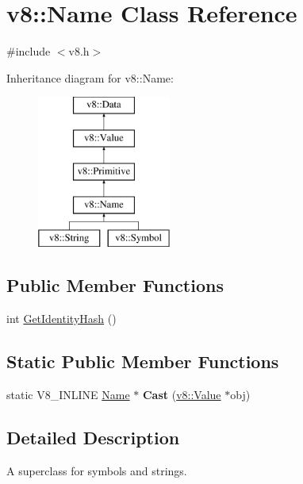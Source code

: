 \hypertarget{classv8_1_1Name}{}\section{v8\+:\+:Name Class Reference}
\label{classv8_1_1Name}


{\ttfamily \#include $<$v8.\+h$>$}

Inheritance diagram for v8\+:\+:Name\+:\begin{figure}[H]
\begin{center}
\leavevmode
\includegraphics[height=5.000000cm]{classv8_1_1Name}
\end{center}
\end{figure}
\subsection*{Public Member Functions}
\begin{DoxyCompactItemize}
\item 
int \hyperlink{classv8_1_1Name_aef60fce47685fad12914304f6bc52bf2}{Get\+Identity\+Hash} ()
\end{DoxyCompactItemize}
\subsection*{Static Public Member Functions}
\begin{DoxyCompactItemize}
\item 
\hypertarget{classv8_1_1Name_a8291aa8958f5dfb67d4415510f584ac4}{}static V8\+\_\+\+I\+N\+L\+I\+N\+E \hyperlink{classv8_1_1Name}{Name} $\ast$ {\bfseries Cast} (\hyperlink{classv8_1_1Value}{v8\+::\+Value} $\ast$obj)\label{classv8_1_1Name_a8291aa8958f5dfb67d4415510f584ac4}

\end{DoxyCompactItemize}


\subsection{Detailed Description}
A superclass for symbols and strings. 

